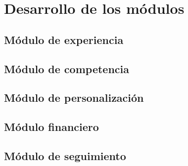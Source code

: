 
\chapter{Desarrollo de los módulos}\label{ch:modulos}


     \label{mod:general}

    \section{Módulo de experiencia}\label{mod:exp}
    

    \section{Módulo de competencia}\label{mod:comp}
    



    \section{Módulo de personalización}\label{mod:pers}
    


    \section{Módulo financiero}\label{mod:financ}
    

    
    \section{Módulo de seguimiento}\label{mod:seguim}
    
